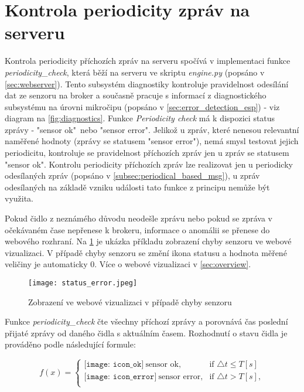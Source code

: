 \section{Kontrola periodicity zpráv na serveru} \label{sec:periodicity_check}
Kontrola periodicity příchozích zpráv na serveru spočívá v implementaci funkce \textit{periodicity\_check}, která běží na serveru ve skriptu \textit{engine.py} (popsáno v \cref{sec:webserver}). Tento subsystém diagnostiky kontroluje pravidelnost odesílání dat ze senzoru na broker a současně pracuje s informací z diagnostického subsystému na úrovni mikročipu (popsáno v \cref{sec:error_detection_esp}) - viz diagram na \cref{fig:diagnostics}. Funkce \textit{Periodicity check} má k dispozici status zprávy - "sensor ok"\ nebo "sensor error". Jelikož u zpráv, které nenesou relevantní naměřené hodnoty (zprávy se statusem "sensor error"), nemá smysl testovat jejich periodicitu, kontroluje se pravidelnost příchozích zpráv jen u zpráv se statusem "sensor ok". Kontrolu periodicity příchozích zpráv lze realizovat jen u periodicky odesílaných zpráv (popsáno v \cref{subsec:periodical_based_msg}), u zpráv odesílaných na základě vzniku události tato funkce z principu nemůže být využita. \par 
Pokud čidlo z neznámého důvodu neodešle zprávu nebo pokud se zpráva v očekávaném čase nepřenese k brokeru, informace o anomálii se přenese do webového rozhraní. Na \cref{fig:status_error} je ukázka příkladu zobrazení chyby senzoru ve webové vizualizaci. V případě chyby senzoru se změní ikona statusu a hodnota měřené veličiny je automaticky 0. Více o webové vizualizaci v \cref{sec:overview}.

\begin{figure}[H]
  \centering
  \texttt{[image: status\_error.jpeg]}
  \caption{Zobrazení ve webové vizualizaci v případě chyby senzoru}
  \label{fig:status_error}
\end{figure} 

Funkce \textit{periodicity\_check} čte všechny příchozí zprávy a porovnává čas poslední přijaté zprávy od daného čidla s aktuálním časem. Rozhodnutí o stavu čidla je prováděno podle následující formule: 

\[
    f(x)= 
\begin{cases}
    {\texttt{[image: icon\_ok]}} \ \text{sensor ok}, & \text{if }  \triangle t \leq T [s]\\
    {\texttt{[image: icon\_error]}} \ \text{sensor error}, & \text{if }  \triangle t > T [s],  \\
\end{cases}
\]

